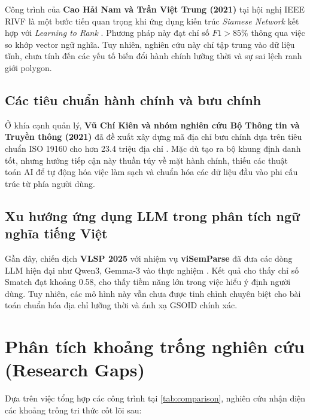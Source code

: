 Công trình của \textbf{Cao Hải Nam và Trần Việt Trung (2021)} tại hội nghị IEEE RIVF là một bước tiến quan trọng khi ứng dụng kiến trúc \textit{Siamese Network} kết hợp với \textit{Learning to Rank} \cite{cao2021deep}. Phương pháp này đạt chỉ số $F1 > 85\%$ thông qua việc so khớp vector ngữ nghĩa. Tuy nhiên, nghiên cứu này chỉ tập trung vào dữ liệu tĩnh, chưa tính đến các yếu tố biến đổi hành chính lưỡng thời và sự sai lệch ranh giới polygon.

\subsection{Các tiêu chuẩn hành chính và bưu chính}
Ở khía cạnh quản lý, \textbf{Vũ Chí Kiên và nhóm nghiên cứu Bộ Thông tin và Truyền thông (2021)} đã đề xuất xây dựng mã địa chỉ bưu chính dựa trên tiêu chuẩn ISO 19160 cho hơn 23.4 triệu địa chỉ \cite{kien2021}. Mặc dù tạo ra bộ khung định danh tốt, nhưng hướng tiếp cận này thuần túy về mặt hành chính, thiếu các thuật toán AI để tự động hóa việc làm sạch và chuẩn hóa các dữ liệu đầu vào phi cấu trúc từ phía người dùng.

\subsection{Xu hướng ứng dụng LLM trong phân tích ngữ nghĩa tiếng Việt}
Gần đây, chiến dịch \textbf{VLSP 2025} với nhiệm vụ \textbf{viSemParse} đã đưa các dòng LLM hiện đại như Qwen3, Gemma-3 vào thực nghiệm \cite{vlsp2025}. Kết quả cho thấy chỉ số Smatch đạt khoảng 0.58, cho thấy tiềm năng lớn trong việc hiểu ý định người dùng. Tuy nhiên, các mô hình này vẫn chưa được tinh chỉnh chuyên biệt cho bài toán chuẩn hóa địa chỉ lưỡng thời và ánh xạ GSOID chính xác.

\section{Phân tích khoảng trống nghiên cứu (Research Gaps)}
\label{sec:research-gaps}

Dựa trên việc tổng hợp các công trình tại \cref{tab:comparison}, nghiên cứu nhận diện các khoảng trống tri thức cốt lõi sau:

